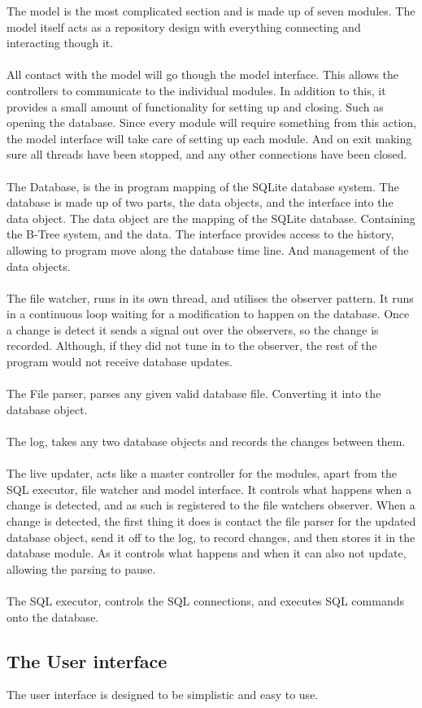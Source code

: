 The model is the most complicated section and is made up of seven modules. The model itself acts as a repository design with everything connecting and interacting though it.
\\\\
All contact with the model will go though the model interface. This allows the controllers to communicate to the individual modules. In addition to this, it provides a small amount of functionality for setting up and closing. Such as opening the database. Since every module will require something from this action, the model interface will take care of setting up each module. And on exit making sure all threads have been stopped, and any other connections have been closed.
\\\\
The Database, is the in program mapping of the SQLite database system. The database is made up of two parts, the data objects, and the interface into the data object. The data object are the mapping of the SQLite database. Containing the B-Tree system, and the data. The interface provides access to the history, allowing to program move along the database time line. And management of the data objects.
\\\\
The file watcher, runs in its own thread, and utilises the observer pattern. It runs in a continuous loop waiting for a modification to happen on the database. Once a change is detect it sends a signal out over the observers, so the change is recorded. Although, if they did not tune in to the observer, the rest of the program would not receive database updates.
\\\\
The File parser, parses any given valid database file. Converting it into the database object.
\\\\
The log, takes any two database objects and records the changes between them.
\\\\
The live updater, acts like a master controller for the modules, apart from the SQL executor, file watcher and model interface. It controls what happens when a change is detected, and as such is registered to the file watchers observer. When a change is detected, the first thing it does is contact the file parser for the updated database object, send it off to the log, to record changes, and then stores it in the database module. As it controls what happens and when it can also not update, allowing the parsing to pause.
\\\\
The SQL executor, controls the SQL connections, and executes SQL commands onto the database.

\subsection{The User interface}
\label{subsec:high_user_interface}

The user interface is designed to be simplistic and easy to use. 